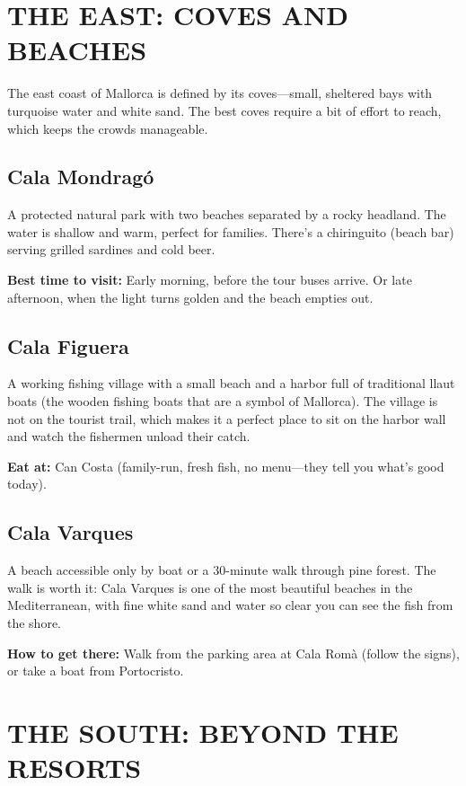 \documentclass[
    language=english,
    doctype=travel-guide,
    institution=none,
]{../../omnilatex}
\begin{document}
\section*{THE EAST: COVES AND BEACHES}

The east coast of Mallorca is defined by its coves---small, sheltered bays with turquoise water and white sand. The best coves require a bit of effort to reach, which keeps the crowds manageable.

\subsection{Cala Mondrag\'{o}}

A protected natural park with two beaches separated by a rocky headland. The water is shallow and warm, perfect for families. There's a chiringuito (beach bar) serving grilled sardines and cold beer.

\textbf{Best time to visit:} Early morning, before the tour buses arrive. Or late afternoon, when the light turns golden and the beach empties out.

\subsection{Cala Figuera}

A working fishing village with a small beach and a harbor full of traditional llaut boats (the wooden fishing boats that are a symbol of Mallorca). The village is not on the tourist trail, which makes it a perfect place to sit on the harbor wall and watch the fishermen unload their catch.

\textbf{Eat at:} Can Costa (family-run, fresh fish, no menu---they tell you what's good today).

\subsection{Cala Varques}

A beach accessible only by boat or a 30-minute walk through pine forest. The walk is worth it: Cala Varques is one of the most beautiful beaches in the Mediterranean, with fine white sand and water so clear you can see the fish from the shore.

\textbf{How to get there:} Walk from the parking area at Cala Rom\`{a} (follow the signs), or take a boat from Portocristo.

\section*{THE SOUTH: BEYOND THE RESORTS}
\end{document}
